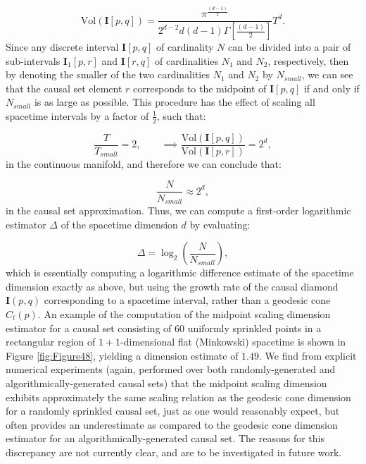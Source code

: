 \documentclass{article}
\begin{document}
\begin{equation}
\mathrm{Vol} \left( \mathbf{I} \left[ p, q \right] \right) = \frac{\pi^{\frac{\left( d - 1 \right)}{2}}}{2^{d - 2} d \left( d - 1 \right) \Gamma \left[ \frac{\left( d - 1 \right)}{2} \right]} T^d.
\end{equation}
Since any discrete interval ${\mathbf{I} \left[ p, q \right]}$ of cardinality $N$ can be divided into a pair of sub-intervals ${\mathbf{I}_1 \left[ p, r \right]}$ and ${\mathbf{I} \left[ r, q \right]}$ of cardinalities ${N_1}$ and ${N_2}$, respectively, then by denoting the smaller of the two cardinalities ${N_1}$ and ${N_2}$ by ${N_{small}}$, we can see that the causal set element $r$ corresponds to the midpoint of ${\mathbf{I} \left[ p, q \right]}$ if and only if ${N_{small}}$ is as large as possible. This procedure has the effect of scaling all spacetime intervals by a factor of ${\frac{1}{2}}$, such that:

\begin{equation}
\frac{T}{T_{small}} = 2, \qquad \implies \frac{\mathrm{Vol} \left( \mathbf{I} \left[ p, q \right] \right)}{\mathrm{Vol} \left( \mathbf{I} \left[ p, r \right] \right)} = 2^d,
\end{equation}
in the continuous manifold, and therefore we can conclude that:

\begin{equation}
\frac{N}{N_{small}} \approx 2^d,
\end{equation}
in the causal set approximation. Thus, we can compute a first-order logarithmic estimator ${\Delta}$ of the spacetime dimension $d$ by evaluating:

\begin{equation}
\Delta = \log_2 \left( \frac{N}{N_{small}} \right),
\end{equation}
which is essentially computing a logarithmic difference estimate of the spacetime dimension exactly as above, but using the growth rate of the causal diamond ${\mathbf{I} \left( p, q \right)}$ corresponding to a spacetime interval, rather than a geodesic cone ${C_t \left( p \right)}$. An example of the computation of the midpoint scaling dimension estimator for a causal set consisting of 60 uniformly sprinkled points in a rectangular region of ${1 + 1}$-dimensional flat (Minkowski) spacetime is shown in Figure \ref{fig:Figure48}, yielding a dimension estimate of ${1.49}$. We find from explicit numerical experiments (again, performed over both randomly-generated and algorithmically-generated causal sets) that the midpoint scaling dimension exhibits approximately the same scaling relation as the geodesic cone dimension for a randomly sprinkled causal set, just as one would reasonably expect, but often provides an underestimate as compared to the geodesic cone dimension estimator for an algorithmically-generated causal set. The reasons for this discrepancy are not currently clear, and are to be investigated in future work.
\end{document}
